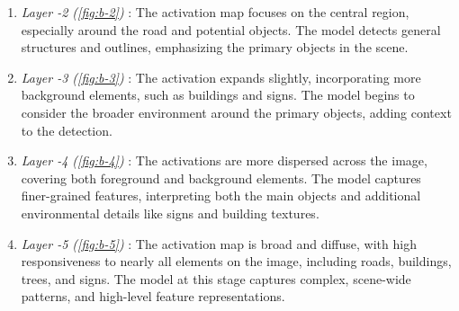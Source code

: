 \begin{enumerate}
    \item \textit{Layer -2 (\ref{fig:b-2})} : The activation map focuses on the central region, especially around the road and potential objects. The model detects general structures and outlines, emphasizing the primary objects in the scene.
    \item \textit{Layer -3 (\ref{fig:b-3})} : The activation expands slightly, incorporating more background elements, such as buildings and signs. The model begins to consider the broader environment around the primary objects, adding context to the detection.
    \item \textit{Layer -4 (\ref{fig:b-4})} : The activations are more dispersed across the image, covering both foreground and background elements. The model captures finer-grained features, interpreting both the main objects and additional environmental details like signs and building textures.
    \item \textit{Layer -5 (\ref{fig:b-5})} : The activation map is broad and diffuse, with high responsiveness to nearly all elements on the image, including roads, buildings, trees, and signs. The model at this stage captures complex, scene-wide patterns, and high-level feature representations.
\end{enumerate}


